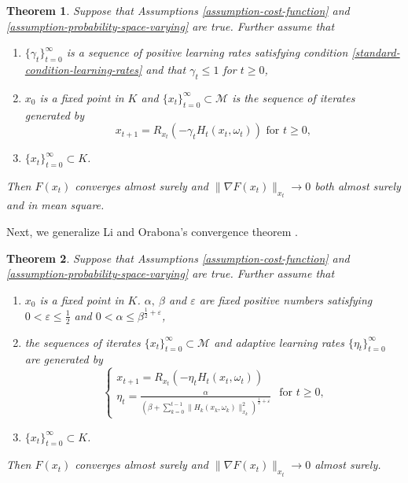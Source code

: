 \documentclass{amsart}
\newcommand{\ve}{\varepsilon}
\newcommand{\M}{\mathcal{M}}
\newcommand{\g}{\gamma}
\theoremstyle{plain}
\newtheorem{theorem}{Theorem}[section]
\theoremstyle{definition}
\theoremstyle{remark}
\numberwithin{theorem}{section}
\numberwithin{equation}{section}
\begin{document}
\begin{theorem}\label{THM-Omega-varying-deterministic-learning-rate}
Suppose that Assumptions \ref{assumption-cost-function} and \ref{assumption-probability-space-varying} are true. Further assume that
\begin{enumerate}
	\item $\{\g_t\}_{t=0}^\infty$ is a sequence of positive learning rates satisfying condition \eqref{standard-condition-learning-rates} and that $\g_t\leq 1$ for $t\geq 0$,
	\item $x_0$ is a fixed point in $K$ and $\{x_t\}_{t=0}^\infty \subset \M$ is the sequence of iterates generated by 
	\begin{equation}\label{eq-SGD-update-Omega-varying-deterministic-learning-rate}
	x_{t+1} = R_{x_t}(-\g_t H_t(x_t,\omega_t)) \text{ for } t \geq 0, 
	\end{equation}
	\item $\{x_t\}_{t=0}^\infty \subset K$.
\end{enumerate}
Then $F(x_t)$ converges almost surely and $\|\nabla F(x_t)\|_{x_t} \rightarrow 0$ both almost surely and in mean square. 
\end{theorem}

Next, we generalize Li and Orabona's convergence theorem \cite[Theorem 2]{Li-Orabona}.

\begin{theorem}\label{THM-Omega-varying-adaptive-learning-rate}
Suppose that Assumptions \ref{assumption-cost-function} and \ref{assumption-probability-space-varying} are true. Further assume that
\begin{enumerate}
	\item $x_0$ is a fixed point in $K$. $\alpha,~\beta$ and $\ve$ are fixed positive numbers satisfying  $0 < \ve \leq \frac{1}{2}$ and $ 0<\alpha \leq \beta^{\frac{1}{2}+\ve}$,
	\item the sequences of iterates $\{x_t\}_{t=0}^\infty \subset \M$ and adaptive learning rates $\{\eta_t\}_{t=0}^\infty$ are  generated by
	\begin{equation}\label{eq-SGD-update-Omega-varying-adaptive-learning-rate}
	\begin{cases}
	x_{t+1} = R_{x_t}(-\eta_t H_t(x_t,\omega_t)) \\
	\eta_t = \frac{\alpha}{(\beta + \sum_{k=0}^{t-1}\|H_k(x_k,\omega_k)\|_{x_k}^2)^{\frac{1}{2}+\ve}}
	\end{cases}\text{ for } t \geq 0, 
	\end{equation}
	\item $\{x_t\}_{t=0}^\infty \subset K$.
\end{enumerate}
Then $F(x_t)$ converges almost surely and $\|\nabla F(x_t)\|_{x_t} \rightarrow 0$ almost surely. 
\end{theorem}
\end{document}
